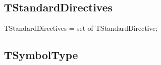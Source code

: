 \documentclass{report}
\newif\ifpdf
\begin{document}
\subsection*{TStandardDirectives}
\fi
\label{PasDoc_Tokenizer-TStandardDirectives}
\begin{list}{}{
\setlength{\itemindent}{0cm}
\setlength{\listparindent}{0cm}
\setlength{\leftmargin}{\evensidemargin}
\addtolength{\leftmargin}{\tmplength}
\settowidth{\labelsep}{X}
\addtolength{\leftmargin}{\labelsep}
\setlength{\labelwidth}{\tmplength}
}
\item[\textbf{Declaration}\hfill]
\ifpdf
\begin{flushleft}
\fi
\begin{ttfamily}
TStandardDirectives = set of TStandardDirective;\end{ttfamily}

\ifpdf
\end{flushleft}
\fi

\end{list}
\ifpdf
\subsection*{\large{\textbf{TSymbolType}}\normalsize\hspace{1ex}\hrulefill}
\else
\end{document}
